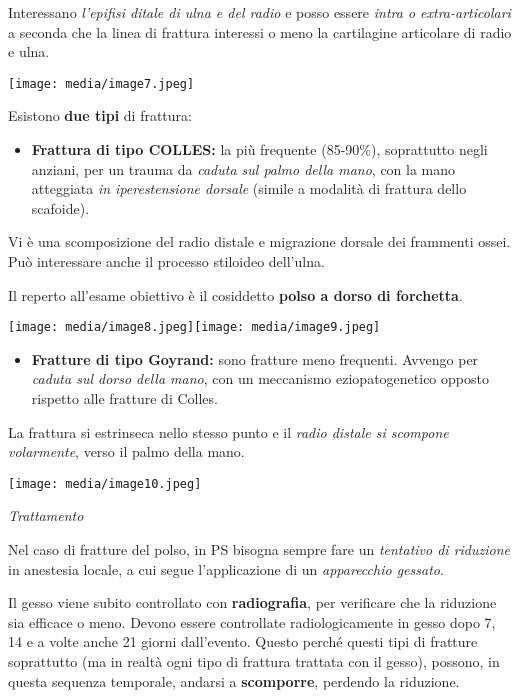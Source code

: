 \documentclass[]{article}
\begin{document}
Interessano \emph{l'epifisi ditale di ulna e del radio} e posso essere
\emph{intra o extra-articolari} a seconda che la linea di frattura
interessi o meno la cartilagine articolare di radio e ulna.

\texttt{[image: media/image7.jpeg]}

Esistono \textbf{due tipi} di frattura:

\begin{itemize}
\item
  \textbf{Frattura di tipo COLLES:} la più frequente (85-90\%),
  soprattutto negli anziani, per un trauma da \emph{caduta sul palmo
  della mano}, con la mano atteggiata \emph{in iperestensione dorsale}
  (simile a modalità di frattura dello scafoide).
\end{itemize}

Vi è una scomposizione del radio distale e migrazione dorsale dei
frammenti ossei. Può interessare anche il processo stiloideo dell'ulna.

Il reperto all'esame obiettivo è il cosiddetto \textbf{polso a dorso di
forchetta}.

\texttt{[image: media/image8.jpeg]}\texttt{[image: media/image9.jpeg]}

\begin{itemize}
\item
  \textbf{Fratture di tipo Goyrand:} sono fratture meno frequenti.
  Avvengo per \emph{caduta sul dorso della mano}, con un meccanismo
  eziopatogenetico opposto rispetto alle fratture di Colles.
\end{itemize}

La frattura si estrinseca nello stesso punto e il \emph{radio distale si
scompone volarmente}, verso il palmo della mano.

\texttt{[image: media/image10.jpeg]}

\emph{Trattamento}

Nel caso di fratture del polso, in PS bisogna sempre fare un
\emph{tentativo di riduzione} in anestesia locale, a cui segue
l'applicazione di un \emph{apparecchio gessato}.

Il gesso viene subito controllato con \textbf{radiografia}, per
verificare che la riduzione sia efficace o meno. Devono essere
controllate radiologicamente in gesso dopo 7, 14 e a volte anche 21
giorni dall'evento. Questo perché questi tipi di fratture soprattutto
(ma in realtà ogni tipo di frattura trattata con il gesso), possono, in
questa sequenza temporale, andarsi a \textbf{scomporre}, perdendo la
riduzione.
\end{document}
